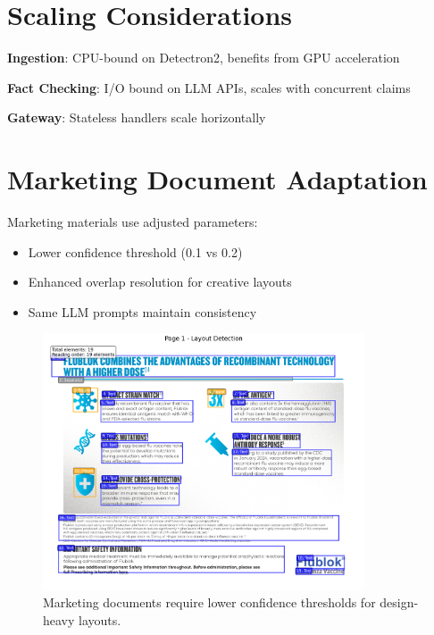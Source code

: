 \documentclass[11pt]{article}
\begin{document}
\section{Scaling Considerations}

\textbf{Ingestion}: CPU-bound on Detectron2, benefits from GPU acceleration

\textbf{Fact Checking}: I/O bound on LLM APIs, scales with concurrent claims

\textbf{Gateway}: Stateless handlers scale horizontally

\section{Marketing Document Adaptation}

Marketing materials use adjusted parameters:
\begin{itemize}
\item Lower confidence threshold (0.1 vs 0.2)
\item Enhanced overlap resolution for creative layouts
\item Same LLM prompts maintain consistency
\end{itemize}

\begin{figure}[htbp]
\centering
\includegraphics[width=0.85\textwidth]{marketing_layout_example.png}
\caption{Marketing documents require lower confidence thresholds for design-heavy layouts.}
\end{figure}
\end{document}
